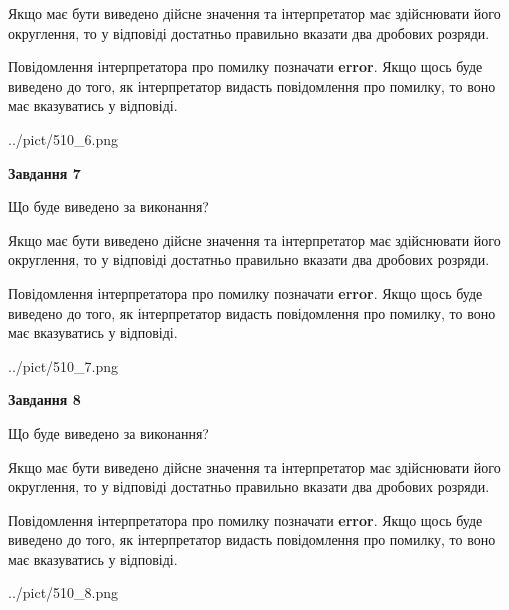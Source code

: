 \documentclass[12pt, ukrainian]{article}
\begin{document}
{\begin {Large}
Якщо має бути виведено дійсне значення та інтерпретатор має здійснювати його округлення, 
то у відповіді достатньо правильно вказати два дробових розряди.

Повідомлення інтерпретатора про помилку позначати \textbf{error}.
Якщо щось буде виведено до того, як інтерпретатор видасть повідомлення про помилку, 
то воно має вказуватись у відповіді. \par

\begin{center}
	{../pict/510_6.png}
\end{center}
\newpage

{\begin {center}\textbf{Завдання 7}\end {center}}\par
Що буде виведено за виконання? \par

Якщо має бути виведено дійсне значення та інтерпретатор має здійснювати його округлення, 
то у відповіді достатньо правильно вказати два дробових розряди.

Повідомлення інтерпретатора про помилку позначати \textbf{error}.
Якщо щось буде виведено до того, як інтерпретатор видасть повідомлення про помилку, 
то воно має вказуватись у відповіді. \par

\begin{center}
	{../pict/510_7.png}
\end{center}
\newpage

{\begin {center}\textbf{Завдання 8}\end {center}}\par
Що буде виведено за виконання? \par

Якщо має бути виведено дійсне значення та інтерпретатор має здійснювати його округлення, 
то у відповіді достатньо правильно вказати два дробових розряди.

Повідомлення інтерпретатора про помилку позначати \textbf{error}.
Якщо щось буде виведено до того, як інтерпретатор видасть повідомлення про помилку, 
то воно має вказуватись у відповіді. \par

\begin{center}
	{../pict/510_8.png}
\end{center}
\newpage


\end{Large}}
\end{document}
